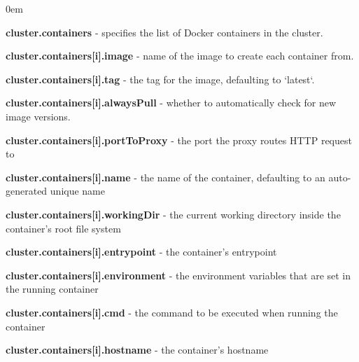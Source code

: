 \documentclass[a4paper,11pt,twoside]{report}
\begin{document}
\begin{list}{-}{}
  \itemsep0em
  \item\textbf{{cluster.containers}} - specifies the list of Docker containers in the cluster.

  \item\textbf{{cluster.containers[i].image}} - name of the image to create each container from.
  \item\textbf{{cluster.containers[i].tag}} - the tag for the image, defaulting to `latest`.
  \item\textbf{{cluster.containers[i].alwaysPull}} - whether to automatically check for new image versions.
  \item\textbf{{cluster.containers[i].portToProxy}} - the port the proxy routes HTTP request to
  \item\textbf{{cluster.containers[i].name}} - the name of the container, defaulting to an auto-generated unique name
  \item\textbf{{cluster.containers[i].workingDir}} - the current working directory inside the container's root file system
  \item\textbf{{cluster.containers[i].entrypoint}} - the container's entrypoint
  \item\textbf{{cluster.containers[i].environment}} - the environment variables that are set in the running container
  \item\textbf{{cluster.containers[i].cmd}} - the command to be executed when running the container
  \item\textbf{{cluster.containers[i].hostname}} - the container's hostname


\end{list}
\end{document}
